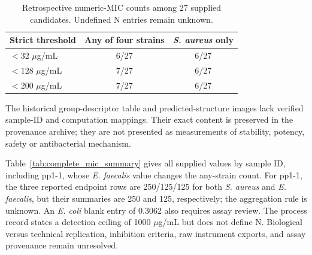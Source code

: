 \documentclass[journal]{IEEEtran}
\begin{document}
\begin{table}[!t]
\caption{Retrospective numeric-MIC counts among 27 supplied candidates. Undefined N entries remain unknown.}
\label{tab:comparison}
\centering
\begin{tabular}{lcc}
\toprule
Strict threshold & Any of four strains & \textit{S. aureus} only \\
\midrule
$<32$ $\mu$g/mL & 6/27 & 6/27 \\
$<128$ $\mu$g/mL & 7/27 & 6/27 \\
$<200$ $\mu$g/mL & 7/27 & 6/27 \\
\bottomrule
\end{tabular}
\end{table}

The historical group-descriptor table and predicted-structure images lack verified sample-ID and computation mappings. Their exact content is preserved in the provenance archive; they are not presented as measurements of stability, potency, safety or antibacterial mechanism.








Table~\ref{tab:complete_mic_summary} gives all supplied values by sample ID, including pp1-1, whose \textit{E. faecalis} value changes the any-strain count. For pp1-1, the three reported endpoint rows are 250/125/125 for both \textit{S. aureus} and \textit{E. faecalis}, but their summaries are 250 and 125, respectively; the aggregation rule is unknown. An \textit{E. coli} blank entry of 0.3062 also requires assay review. The process record states a detection ceiling of 1000 $\mu$g/mL but does not define N. Biological versus technical replication, inhibition criteria, raw instrument exports, and assay provenance remain unresolved.
\end{document}
